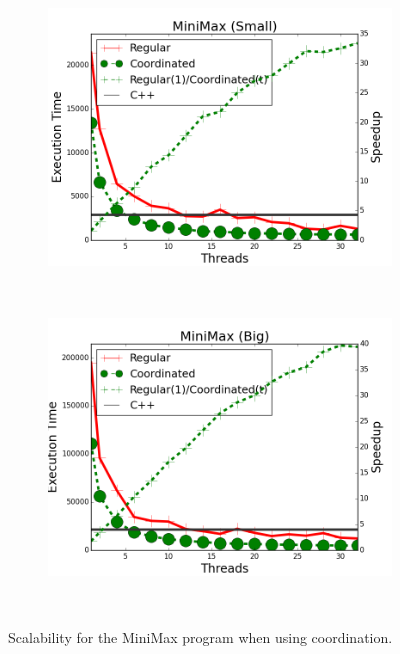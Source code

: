 \begin{figure}[]
        \centering
        \begin{subfigure}[b]{\plotsize\textwidth}
           \includegraphics[width=\textwidth]{experiments/coordination/cmp-min-max-tictactoe-small.png}
           \label{fig:coordination:coord_minimax_small}
        \end{subfigure}
        ~
        \begin{subfigure}[b]{\plotsize\textwidth}
           \includegraphics[width=\textwidth]{experiments/coordination/cmp-min-max-tictactoe-big.png}
           \label{fig:coordination:coord_minimax_big}
        \end{subfigure} \\

        \caption{Scalability for the MiniMax program when using coordination.}

        \label{fig:coordination:results_minmax}
\end{figure}

\clearpage
